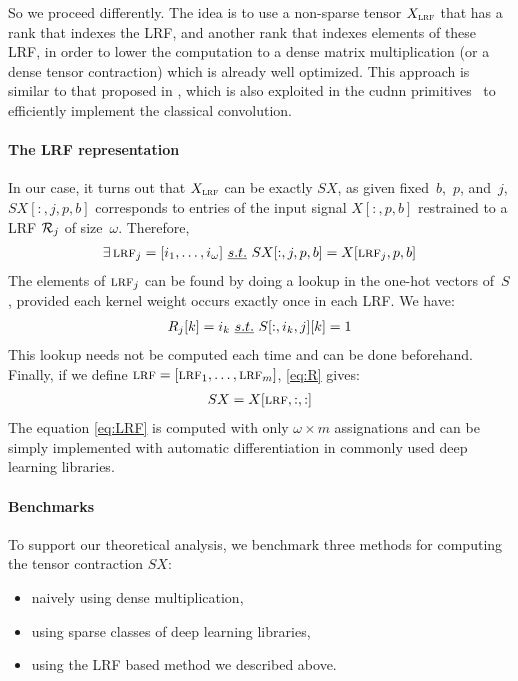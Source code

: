 So we proceed differently. The idea is to use a non-sparse tensor $X_{\operatorname{\textsc{lrf}}}$ that has a rank that indexes the LRF, and another rank that indexes elements of these LRF, in order to lower the computation to a dense matrix multiplication (or a dense tensor contraction) which is already well optimized. This approach is similar to that proposed in \cite{chellapilla2006high}, which is also exploited in the cudnn primitives~\citep{chetlur2014cudnn} to efficiently implement the classical convolution.

\paragraph{The LRF representation}
In our case, it turns out that $X_{\operatorname{\textsc{lrf}}}$ can be exactly $SX$, as given fixed~$b$,~$p$, and~$j$, $SX[:,j,p,b]$ corresponds to entries of the input signal $X[:,p,b]$ restrained to a LRF $\mathcal{R}_j$ of size~$\omega$. Therefore,
\begin{gather}
\exists \operatorname{\textsc{lrf}}_j = [i_1, \ldots, i_\omega]~\emph{s.t.}~ SX[:,j,p,b] = X[\operatorname{\textsc{lrf}}_j, p, b]
\label{eq:R}
\end{gather}
The elements of $\operatorname{\textsc{lrf}}_j$ can be found by doing a lookup in the one-hot vectors of~$S$, provided each kernel weight occurs exactly once in each LRF. We have:
\begin{gather}
R_j[k] = i_k~\emph{s.t.}~ S[:,i_k,j][k] = 1
\end{gather}
This lookup needs not be computed each time and can be done beforehand. Finally, if we define $\operatorname{\textsc{lrf}} = [\operatorname{\textsc{lrf}}_1, \ldots, \operatorname{\textsc{lrf}}_m]$, \eqref{eq:R} gives:
\begin{gather}
SX = X[\operatorname{\textsc{lrf}}, :, :]
\label{eq:LRF}
\end{gather}
The equation \eqref{eq:LRF} is computed with only $\omega \times m$ assignations and can be simply implemented with automatic differentiation in commonly used deep learning libraries.

\paragraph{Benchmarks}
To support our theoretical analysis, we benchmark three methods for computing the tensor contraction $SX$:
\begin{itemize}
  \item naively using dense multiplication,
  \item using sparse classes of deep learning libraries,
  \item using the LRF based method we described above.
\end{itemize}

